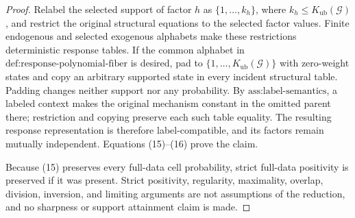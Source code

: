 \documentclass{article}
\begin{document}
\begin{proof}
Relabel the selected support of factor \(h\) as \(\{1,\ldots,k_h\}\), where \(k_h\leq K_{\mathrm{ub}}(\mathcal G)\), and restrict the original structural equations to the selected factor values. Finite endogenous and selected exogenous alphabets make these restrictions deterministic response tables. If the common alphabet in \(\text{def:response-polynomial-fiber}\) is desired, pad to \(\{1,\ldots,K_{\mathrm{ub}}(\mathcal G)\}\) with zero-weight states and copy an arbitrary supported state in every incident structural table. Padding changes neither support nor any probability. By \(\text{ass:label-semantics}\), a labeled context makes the original mechanism constant in the omitted parent there; restriction and copying preserve each such table equality. The resulting response representation is therefore label-compatible, and its factors remain mutually independent. Equations (15)--(16) prove the claim.

Because (15) preserves every full-data cell probability, strict full-data positivity is preserved if it was present. Strict positivity, regularity, maximality, overlap, division, inversion, and limiting arguments are not assumptions of the reduction, and no sharpness or support attainment claim is made.
\end{proof}
\end{document}

